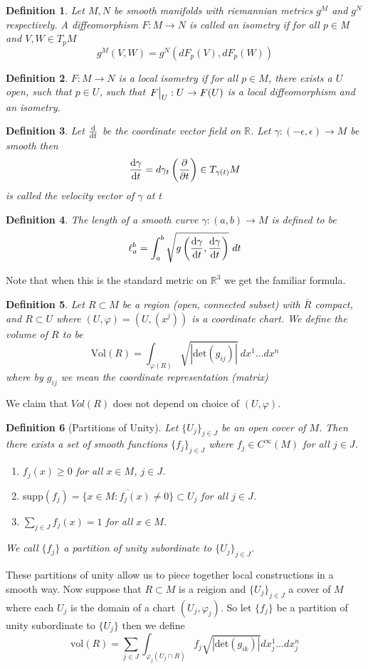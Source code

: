 \documentclass[a4paper]{article}
\newtheorem*{defn}{Definition}
\begin{document}
\begin{defn}
  Let $M,N$ be smooth manifolds with riemannian metrics $g^M$ and $g^N$ respectively. A diffeomorphism $F:M \rightarrow N$ is called an isometry if for all $p \in $M and $V,W \in T_pM$
  \[
    g^M(V,W) = g^N(dF_p(V), dF_p(W))
  \]
\end{defn}

\begin{defn}
  $F:M \rightarrow N$ is a local isometry if for all $p \in M$, there exists a $U$ open, such that $p \in U$, such that $\eval{F}_U: U \rightarrow F(U)$ is a local diffeomorphism and an isometry.
\end{defn}

\begin{defn}
  Let $\dv{}{t}$ be the coordinate vector field on $\mathds{R}$. Let $\gamma:(-\epsilon, \epsilon) \rightarrow M$ be smooth then 
  \[
    \dv{\gamma}{t} = d\gamma_t\left(\pdv{}{t}\right) \in T_{\gamma(t)}M
  \]
  is called the velocity vector of $\gamma$ at t
\end{defn}

\begin{defn}
  The length of a smooth curve $\gamma: (a,b) \rightarrow M$ is defined to be
  \[
    \ell_a^b = \int_{a}^b \sqrt{g\left(\dv{\gamma}{t}, \dv{\gamma}{t}\right)}\ dt
  \]
\end{defn}
Note that when this is the standard metric on $\mathds{R}^3$ we get the familiar formula.

\begin{defn}
  Let $R \subset M$ be a region (open, connected subset) with $\bar{R}$ compact, and $R \subset U$ where $(U, \varphi) = (U, (x^j))$ is a coordinate chart. We define the volume of $R$ to be 
  \[
    \text{Vol}(R) = \int_{\varphi(R)} \sqrt{|\text{det}(g_{ij})|}\ dx^1 \dots dx^n
  \]
  where by $g_{ij}$ we mean the coordinate representation (matrix)
\end{defn}
We claim that $Vol(R)$ does not depend on choice of $(U, \varphi)$.

\begin{defn}[Partitions of Unity]
  Let $\{U_j\}_{j\in J}$ be an open cover of $M$. Then there exists a set of smooth functions $\{f_j\}_{j \in J}$ where $f_j \in C^{\infty}(M)$ for all $j \in J$. 
  \begin{enumerate}
    \item $f_j(x) \geq 0$ for all $x\in M$, $j \in J$.
    \item $\text{supp}(f_j) = \overline{\{x \in M: f_j(x) \neq 0\}} \subset U_j$ for all $j \in J$.
    \item $\sum_{j \in J}f_j(x) = 1$ for all $x \in M$.
  \end{enumerate}
  We call $\{f_j\}$ a partition of unity subordinate to $\{U_j\}_{j \in J}$.
\end{defn}
These partitions of unity allow us to piece together local constructions in a smooth way. Now suppose that $R \subset M$ is a reigion and $\{U_j\}_{j\in J}$ a cover of $M$ where each $U_j$ is the domain of a chart $(U_j, \varphi_j)$. So let $\{f_j\}$ be a partition of unity subordinate to $\{U_j\}$ then we define
\[
  \text{vol}(R) = \sum_{j\in J} \int_{\varphi_j(U_j \cap R)} f_j \sqrt{|\text{det}(g_{ik})|} dx_j^1 \dots dx_j^n
\]
\end{document}
